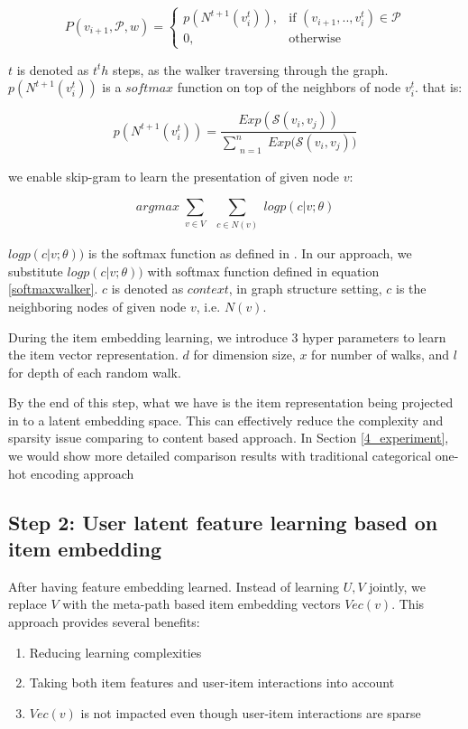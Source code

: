 \begin{equation}\label{hetewalker}
    P(v_{i+1},\mathcal{P},w)= 
        \begin{cases}
            p({N^{t+1}(v_{i}^t)}),& \text{if } (v_{i+1}, .., v_{i}^t) \in \mathcal{P} \\
            0,              & \text{otherwise}
        \end{cases}
\end{equation}

$t$ is denoted as $t^th$ steps, as the walker traversing through the graph.
$p({N^{t+1}(v_{i}^t)})$ is a $softmax$ function on top of the neighbors of node $v_{i}^t$. 
that is:

\begin{equation}\label{softmaxwalker}
    p({N^{t+1}(v_{i}^t)}) = \frac{Exp(\mathcal{S}(v_i,v_j))}{\sum\limits_{\substack{n=1}}^{n} {Exp(\mathcal{S}(v_i,v_j)})}
\end{equation}

we enable skip-gram to learn the presentation of given node $v$:

\begin{equation}\label{skipgram}
    arg max
    \sum\limits_{\substack{v \in V}}
    \sum\limits_{\substack{c \in N(v)}}
    log p({c|v;\theta})
\end{equation}

$log p({c|v;\theta}))$ is the softmax function as defined in \cite{mikolov2013distributed} \cite{mikolov2013efficient}. In our approach, we substitute $log p({c|v;\theta}))$ with softmax function defined in equation \ref{softmaxwalker}. $c$ is denoted as $context$, in graph structure setting, $c$ is the neighboring nodes of given node $v$, i.e. $N(v)$. 

During the item embedding learning, we introduce 3 hyper parameters to learn the item vector representation. $d$ for dimension size, $x$ for number of walks, and $l$ for depth of each random walk.

By the end of this step, what we have is the item representation being projected in to a latent embedding space. This can effectively reduce the complexity and sparsity issue comparing to content based approach. In Section \ref{4_experiment}, we would show more detailed comparison results with traditional categorical one-hot encoding approach

\subsection{Step 2: User latent feature learning based on item embedding}\label{3PCC}
After having feature embedding learned. Instead of learning $U, V$ jointly, we replace $V$ with the meta-path based item embedding vectors $Vec(v)$. This approach provides several benefits:
\begin{enumerate}
        \item Reducing learning complexities
        \item Taking both item features and user-item interactions into account
        \item $Vec(v)$ is not impacted even though user-item interactions are sparse 
\end{enumerate}


